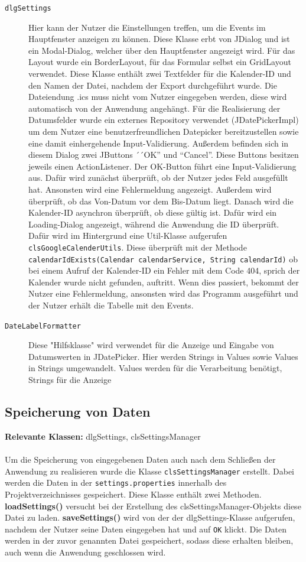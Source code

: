 \documentclass[a4paper]{article}
\begin{document}
\begin{description}
		\item[\texttt{dlgSettings}] Hier kann der Nutzer die Einstellungen treffen, um die Events im Hauptfenster anzeigen zu können. Diese Klasse erbt von JDialog und ist ein Modal-Dialog, welcher über den Hauptfenster angezeigt wird. Für das Layout wurde ein BorderLayout, für das Formular selbst ein GridLayout verwendet. Diese Klasse enthält zwei Textfelder für die Kalender-ID und den Namen der Datei, nachdem der Export durchgeführt wurde. Die Dateiendung .ics muss nicht vom Nutzer eingegeben werden, diese wird automatisch von der Anwendung angehängt. Für die Realisierung der Datumsfelder wurde ein externes Repository verwendet (JDatePickerImpl) um dem Nutzer eine benutzerfreundlichen Datepicker bereitzustellen sowie eine damit einhergehende Input-Validierung. Außerdem befinden sich in diesem Dialog zwei JButtons ´´OK'' und ``Cancel''. Diese Buttons besitzen jeweils einen ActionListener. Der OK-Button führt eine Input-Validierung aus. Dafür wird zunächst überprüft, ob der Nutzer jedes Feld ausgefüllt hat. Ansonsten wird eine Fehlermeldung angezeigt. Außerdem wird überprüft, ob das Von-Datum vor dem Bis-Datum liegt. Danach wird die Kalender-ID asynchron überprüft, ob diese gültig ist. Dafür wird ein Loading-Dialog angezeigt, während die Anwendung die ID überprüft. Dafür wird im Hintergrund eine Util-Klasse aufgerufen \texttt{clsGoogleCalenderUtils}. Diese überprüft mit der Methode \texttt{calendarIdExists(Calendar calendarService, String calendarId)} ob bei einem Aufruf der Kalender-ID ein Fehler mit dem Code 404, sprich der Kalender wurde nicht gefunden, auftritt. Wenn dies passiert, bekommt der Nutzer eine Fehlermeldung, ansonsten wird das Programm ausgeführt und der Nutzer erhält die Tabelle mit den Events.
		
		\item[\texttt{DateLabelFormatter}] Diese "Hilfsklasse" wird verwendet für die Anzeige und Eingabe von Datumswerten in JDatePicker. Hier werden Strings in Values sowie Values in Strings umgewandelt. Values werden für die Verarbeitung benötigt, Strings für die Anzeige
	\end{description}
	
	\subsection{Speicherung von Daten}
	\textbf{Relevante Klassen:} dlgSettings, clsSettingsManager
	\\
	\\
	Um die Speicherung von eingegebenen Daten auch nach dem Schließen der Anwendung zu realisieren wurde die Klasse \texttt{clsSettingsManager} erstellt. Dabei werden die Daten in der \texttt{settings.properties} innerhalb des Projektverzeichnisses gespeichert. Diese Klasse enthält zwei Methoden. \textbf{loadSettings()} versucht bei der Erstellung des clsSettingsManager-Objekts diese Datei zu laden. \textbf{saveSettings()} wird von der der dlgSettings-Klasse aufgerufen, nachdem der Nutzer seine Daten eingegeben hat und auf \texttt{OK} klickt. Die Daten werden in der zuvor genannten Datei gespeichert, sodass diese erhalten bleiben, auch wenn die Anwendung geschlossen wird.
	 
\end{document}
